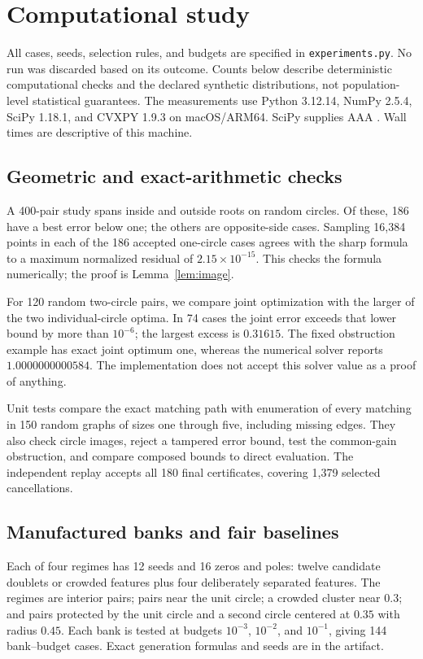 \documentclass[11pt]{article}
\theoremstyle{definition}\newtheorem{definition}[theorem]{Definition}
\begin{document}
\section{Computational study}
All cases, seeds, selection rules, and budgets are specified in \texttt{experiments.py}. No run was discarded based on its outcome. Counts below describe deterministic computational checks and the declared synthetic distributions, not population-level statistical guarantees. The measurements use Python 3.12.14, NumPy 2.5.4, SciPy 1.18.1, and CVXPY 1.9.3 on macOS/ARM64. SciPy supplies AAA \cite{scipy}. Wall times are descriptive of this machine.

\subsection{Geometric and exact-arithmetic checks}
A 400-pair study spans inside and outside roots on random circles. Of these, 186 have a best error below one; the others are opposite-side cases. Sampling 16,384 points in each of the 186 accepted one-circle cases agrees with the sharp formula to a maximum normalized residual of $2.15\times10^{-15}$. This checks the formula numerically; the proof is Lemma~\ref{lem:image}.

For 120 random two-circle pairs, we compare joint optimization with the larger of the two individual-circle optima. In 74 cases the joint error exceeds that lower bound by more than $10^{-6}$; the largest excess is $0.31615$. The fixed obstruction example has exact joint optimum one, whereas the numerical solver reports $1.0000000000584$. The implementation does not accept this solver value as a proof of anything.

Unit tests compare the exact matching path with enumeration of every matching in 150 random graphs of sizes one through five, including missing edges. They also check circle images, reject a tampered error bound, test the common-gain obstruction, and compare composed bounds to direct evaluation. The independent replay accepts all 180 final certificates, covering 1,379 selected cancellations.

\subsection{Manufactured banks and fair baselines}
Each of four regimes has 12 seeds and 16 zeros and poles: twelve candidate doublets or crowded features plus four deliberately separated features. The regimes are interior pairs; pairs near the unit circle; a crowded cluster near $0.3$; and pairs protected by the unit circle and a second circle centered at $0.35$ with radius $0.45$. Each bank is tested at budgets $10^{-3}$, $10^{-2}$, and $10^{-1}$, giving 144 bank--budget cases. Exact generation formulas and seeds are in the artifact.
\end{document}
